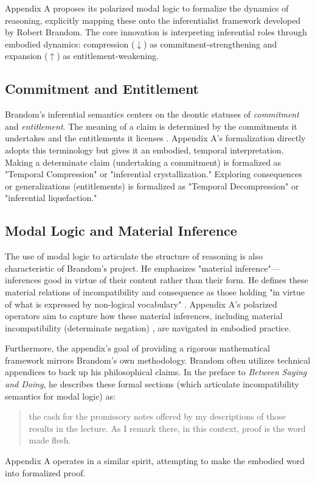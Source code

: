 \documentclass[12pt]{article}
\begin{document}
Appendix A proposes its polarized modal logic to formalize the dynamics of reasoning, explicitly mapping these onto the inferentialist framework developed by Robert Brandom. The core innovation is interpreting inferential roles through embodied dynamics: compression ($\downarrow$) as commitment-strengthening and expansion ($\uparrow$) as entitlement-weakening.

\subsection{Commitment and Entitlement}

Brandom's inferential semantics centers on the deontic statuses of \textit{commitment} and \textit{entitlement}. The meaning of a claim is determined by the commitments it undertakes and the entitlements it licenses \parencite{brandom1994making, Brandom2000}. Appendix A's formalization directly adopts this terminology but gives it an embodied, temporal interpretation. Making a determinate claim (undertaking a commitment) is formalized as "Temporal Compression" or "inferential crystallization." Exploring consequences or generalizations (entitlements) is formalized as "Temporal Decompression" or "inferential liquefaction."

\subsection{Modal Logic and Material Inference}

The use of modal logic to articulate the structure of reasoning is also characteristic of Brandom's project. He emphasizes "material inference"—inferences good in virtue of their content rather than their form. He defines these material relations of incompatibility and consequence as those holding "in virtue of what is expressed by non-logical vocabulary" \parencite[Note 9]{brandom_reason_2013}. Appendix A's polarized operators aim to capture how these material inferences, including material incompatibility (determinate negation) \parencite{Brandom:2019aa}, are navigated in embodied practice.

Furthermore, the appendix's goal of providing a rigorous mathematical framework mirrors Brandom's own methodology. Brandom often utilizes technical appendices to back up his philosophical claims. In the preface to \textit{Between Saying and Doing}, he describes these formal sections (which articulate incompatibility semantics for modal logic) as:
\begin{quote}
the cash for the promissory notes offered by my descriptions of those results in the lecture. As I remark there, in this context, proof is the word made flesh. \parencite[p. xix]{Brandom2008}
\end{quote}
Appendix A operates in a similar spirit, attempting to make the embodied word into formalized proof.
\end{document}
